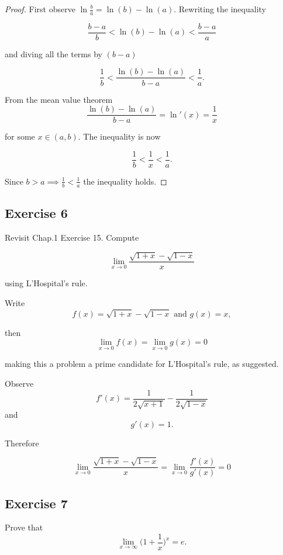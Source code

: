 \documentclass{tufte-book}
\theoremstyle{mytheoremstyle}
\theoremstyle{mylemstyle}
\theoremstyle{mydefstyle}
\begin{document}
\begin{proof}
First observe $\ln\frac{b}{a} = \ln(b) - \ln(a)$.  Rewriting the inequality

\[ \frac{b-a}{b} < \ln(b) - \ln(a) < \frac{b-a}{a} \]

and diving all the terms by $(b-a)$

\[ \frac{1}{b} < \frac{\ln(b) - \ln(a)}{b-a} < \frac{1}{a}. \]

From the mean value theorem
\[ \frac{\ln(b) - \ln(a)}{b-a} = \ln'(x) = \frac{1}{x} \]

for some $x \in (a,b)$. The inequality is now

\[ \frac{1}{b} < \frac{1}{x} < \frac{1}{a}. \]

Since $b > a \implies \frac{1}{b} < \frac{1}{a}$ the inequality holds.
\end{proof}

\subsection{Exercise 6}
Revisit Chap.1 Exercise 15. Compute

\[ \lim_{x\to 0}\frac{\sqrt{1 + x} - \sqrt{1-x} }{x}  \]

using L'Hospital's rule.

Write
\[ f(x) = \sqrt{1 + x} - \sqrt{1-x} \text{ and } g(x) = x, \]

then
\[ \lim_{x \to 0} f(x) = \lim_{x \to 0} g(x) = 0 \]

making this a problem a prime candidate for L'Hospital's rule, as suggested.

Observe
\[ f'(x) = \frac{1}{2\sqrt{x+1}} - \frac{1}{2\sqrt{1-x}} \]
and
\[ g'(x) = 1. \]

Therefore

\[ \lim_{x\to 0}\frac{\sqrt{1 + x} - \sqrt{1-x} }{x} = \lim_{x\to 0} \frac{f'(x)}{g'(x)} = 0 \]

\subsection{Exercise 7}

Prove that
\[ \lim_{x \to \infty} \Big( 1 + \frac{1}{x} \Big)^x = e.\]
\end{document}
